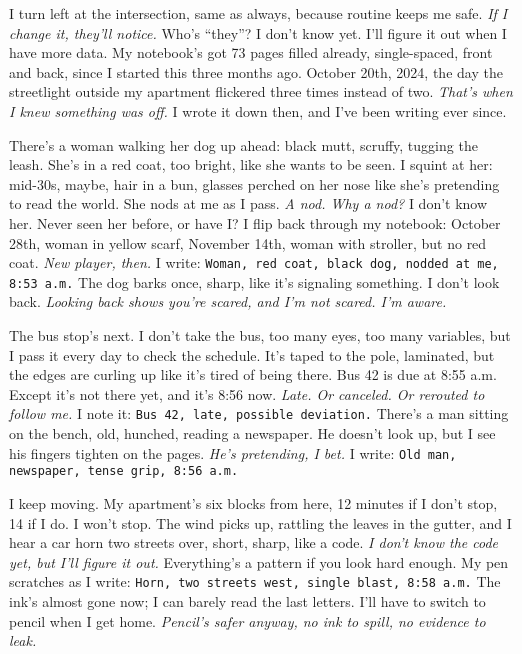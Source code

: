 \documentclass[12pt]{article}
\newcommand{\note}[1]{\texttt{#1}}
\begin{document}
I turn left at the intersection, same as always, because routine keeps me safe. \textit{If I change it, they’ll notice.} Who’s “they”? I don’t know yet. I’ll figure it out when I have more data. My notebook’s got 73 pages filled already, single-spaced, front and back, since I started this three months ago. October 20th, 2024, the day the streetlight outside my apartment flickered three times instead of two. \textit{That’s when I knew something was off.} I wrote it down then, and I’ve been writing ever since.

There’s a woman walking her dog up ahead: black mutt, scruffy, tugging the leash. She’s in a red coat, too bright, like she wants to be seen. I squint at her: mid-30s, maybe, hair in a bun, glasses perched on her nose like she’s pretending to read the world. She nods at me as I pass. \textit{A nod. Why a nod?} I don’t know her. Never seen her before, or have I? I flip back through my notebook: October 28th, woman in yellow scarf, November 14th, woman with stroller, but no red coat. \textit{New player, then.} I write: \note{Woman, red coat, black dog, nodded at me, 8:53 a.m.} The dog barks once, sharp, like it’s signaling something. I don’t look back. \textit{Looking back shows you’re scared, and I’m not scared. I’m aware.}

The bus stop’s next. I don’t take the bus, too many eyes, too many variables, but I pass it every day to check the schedule. It’s taped to the pole, laminated, but the edges are curling up like it’s tired of being there. Bus 42 is due at 8:55 a.m. Except it’s not there yet, and it’s 8:56 now. \textit{Late. Or canceled. Or rerouted to follow me.} I note it: \note{Bus 42, late, possible deviation.} There’s a man sitting on the bench, old, hunched, reading a newspaper. He doesn’t look up, but I see his fingers tighten on the pages. \textit{He’s pretending, I bet.} I write: \note{Old man, newspaper, tense grip, 8:56 a.m.}

I keep moving. My apartment’s six blocks from here, 12 minutes if I don’t stop, 14 if I do. I won’t stop. The wind picks up, rattling the leaves in the gutter, and I hear a car horn two streets over, short, sharp, like a code. \textit{I don’t know the code yet, but I’ll figure it out.} Everything’s a pattern if you look hard enough. My pen scratches as I write: \note{Horn, two streets west, single blast, 8:58 a.m.} The ink’s almost gone now; I can barely read the last letters. I’ll have to switch to pencil when I get home. \textit{Pencil’s safer anyway, no ink to spill, no evidence to leak.}
\end{document}

